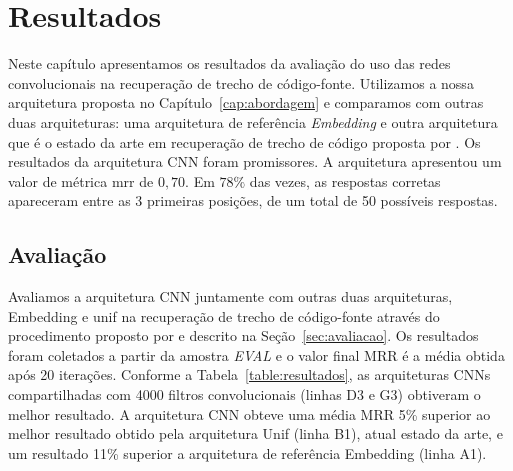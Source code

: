 \chapter{Resultados}
\label{cap:resultados}

Neste capítulo apresentamos os resultados da avaliação do uso das redes convolucionais na recuperação de trecho de código-fonte. Utilizamos a nossa arquitetura proposta no Capítulo~\ref{cap:abordagem} e comparamos com outras duas arquiteturas: uma arquitetura de referência \textit{Embedding} e outra arquitetura que é o estado da arte em recuperação de trecho de código proposta por \cite{cambronero-deep-learning-code-search:2019}. Os resultados da arquitetura CNN foram promissores. A arquitetura apresentou um valor de métrica \acrfull{mrr} de $0,70$. Em $78\%$ das vezes, as respostas corretas apareceram entre as 3 primeiras posições, de um total de 50 possíveis respostas.

\section{Avaliação}

Avaliamos a arquitetura CNN juntamente com outras duas arquiteturas, Embedding e \Gls{unif} na recuperação de trecho de código-fonte através do procedimento proposto por \cite{iyer-etal-2016-summarizing} e descrito na Seção~\ref{sec:avaliacao}. Os resultados foram coletados a partir da amostra \emph{EVAL} e o valor final MRR é a média obtida após 20 iterações. Conforme a Tabela~\ref{table:resultados}, as arquiteturas CNNs compartilhadas com 4000 filtros convolucionais (linhas D3 e G3) obtiveram o melhor resultado. A arquitetura CNN obteve uma média MRR 5\% superior ao melhor resultado obtido pela arquitetura Unif (linha B1), atual estado da arte, e um resultado 11\% superior a arquitetura de referência Embedding (linha A1). 

